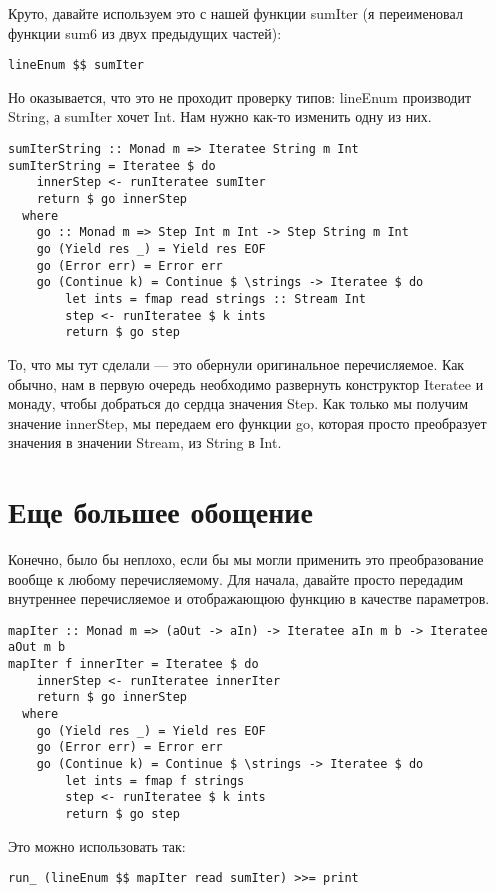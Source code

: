 Круто, давайте используем это с нашей функции sumIter (я переименовал функции sum6 из двух предыдущих частей):
\begin{lstlisting}
lineEnum $$ sumIter
\end{lstlisting}%

Но оказывается, что это не проходит проверку типов: lineEnum производит String, а sumIter хочет Int. Нам нужно как-то изменить одну из них.

\begin{lstlisting}
sumIterString :: Monad m => Iteratee String m Int
sumIterString = Iteratee $ do
    innerStep <- runIteratee sumIter
    return $ go innerStep
  where
    go :: Monad m => Step Int m Int -> Step String m Int
    go (Yield res _) = Yield res EOF
    go (Error err) = Error err
    go (Continue k) = Continue $ \strings -> Iteratee $ do
        let ints = fmap read strings :: Stream Int
        step <- runIteratee $ k ints
        return $ go step
\end{lstlisting}%

То, что мы тут сделали --- это обернули оригинальное перечисляемое. Как обычно, нам в первую очередь необходимо развернуть конструктор Iteratee и монаду, чтобы добраться до сердца значения Step. Как только мы получим значение innerStep, мы передаем его функции go, которая просто преобразует значения в значении Stream, из String в Int.

\section{Еще большее обощение}

Конечно, было бы неплохо, если бы мы могли применить это преобразование вообще к любому перечисляемому. Для начала, давайте просто передадим внутреннее перечисляемое и отображающюю функцию в качестве параметров.

\begin{lstlisting}
mapIter :: Monad m => (aOut -> aIn) -> Iteratee aIn m b -> Iteratee aOut m b
mapIter f innerIter = Iteratee $ do
    innerStep <- runIteratee innerIter
    return $ go innerStep
  where
    go (Yield res _) = Yield res EOF
    go (Error err) = Error err
    go (Continue k) = Continue $ \strings -> Iteratee $ do
        let ints = fmap f strings
        step <- runIteratee $ k ints
        return $ go step
\end{lstlisting}%

Это можно использовать так:

\begin{lstlisting}
run_ (lineEnum $$ mapIter read sumIter) >>= print
\end{lstlisting}%


